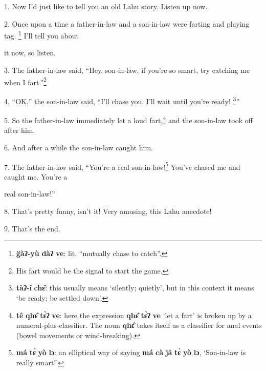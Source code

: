 \setcounter{footnote}{0}

1. Now I'd just like to tell you an old Lahu story. Listen up now.

2. Once upon a time a father-in-law and a son-in-law were farting and playing tag.
\footnote{\textbf{g̈àʔ-yù} \textbf{dàʔ} \textbf{ve}: lit. ``mutually chase to catch''.} I'll tell you about

it now, so listen.

3. The father-in-law said, ``Hey, son-in-law, if you're so smart, try catching
me when I fart.''\footnote{His fart would be the signal to start the game.}

4. ``OK,'' the son-in-law said, ``I'll chase you. I'll wait until you're ready!
\footnote{\textbf{tàʔ-í} \textbf{chɛ̂}: this usually means `silently; quietly', but in this context it means `be ready; be settled down'.}''

5. So the father-in-law immediately let a loud fart,\footnote{\textbf{tê} \textbf{qhɛ̂} \textbf{tɛ̀ʔ} \textbf{ve}: here the expression \textbf{qhɛ̂} \textbf{tɛ̀ʔ} \textbf{ve} `let a fart' is broken up by a numeral-plus-classifier. The noun \textbf{qhɛ̂} takes itself as a classifier for anal events (bowel movements or wind-breaking).} and the son-in-law took
off after him.

6. And after a while the son-in-law caught him.

7. The father-in-law said, ``You're a real son-in-law!\footnote{\textbf{má} \textbf{tɛ̀} \textbf{yò} \textbf{lɔ}: an elliptical way of saying \textbf{má} \textbf{cà} \textbf{jâ} \textbf{tɛ̀} \textbf{yò} \textbf{lɔ}, `Son-in-law is really smart!'} You've chased me and
caught me. You're a

real son-in-law!''

8. That's pretty funny, isn't it! Very amusing, this Lahu anecdote!

9. That's the end.

